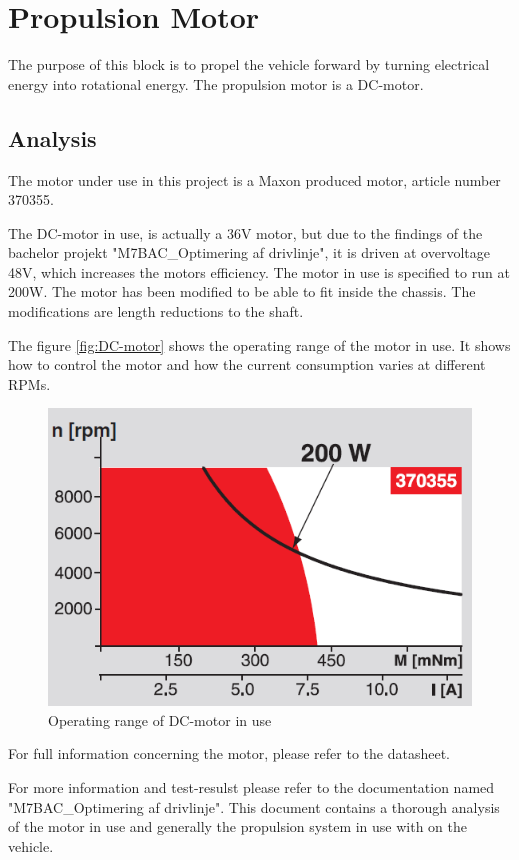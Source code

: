 \section{Propulsion Motor}
The purpose of this block is to propel the vehicle forward by turning electrical energy into rotational energy. The propulsion motor is a DC-motor. 

\subsection{Analysis}
The motor under use in this project is a Maxon produced motor, article number 370355.

The DC-motor in use, is actually a 36V motor, but due to the findings of the bachelor projekt "M7BAC\_Optimering af drivlinje", it is driven at overvoltage 48V, which increases the motors efficiency. The motor in use is specified to run at 200W. 
The motor has been modified to be able to fit inside the chassis. The modifications are length reductions to the shaft.

The figure \vref{fig:DC-motor} shows the operating range of the motor in use. It shows how to control the motor and how the current consumption varies at different RPMs.

\begin{figure}[H]
	\centering
	\includegraphics[width=0.6\linewidth]{Hardware/Pictures/DC-motor_diagram}
	\caption{Operating range of DC-motor in use}
	\label{fig:DC-motor}
\end{figure}

For full information concerning the motor, please refer to the datasheet. 

For more information and test-resulst please refer to the documentation named "M7BAC\_Optimering af drivlinje". This document contains a thorough analysis of the motor in use and generally the propulsion system in use with on the vehicle.  